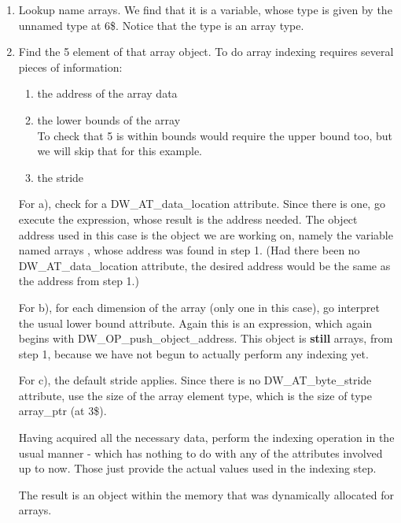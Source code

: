 \begin{enumerate}[1.]

\item Lookup name arrays. We find that it is a variable,
whose type is given by the unnamed type at 6\$. Notice that
the type is an array type.


\item Find the 5 element of that array object. To do array
indexing requires several pieces of information:

\begin{enumerate}[a]

\item  the address of the array data

\item the lower bounds of the array \\
\lbrack To check that 5 is within bounds would require the upper
bound too, but we will skip that for this example. \rbrack

\item the stride 

\end{enumerate}

For a), check for a DW\_AT\_data\_location attribute. Since
there is one, go execute the expression, whose result is
the address needed. The object address used in this case
is the object we are working on, namely the variable named
arrays , whose address was found in step 1. (Had there been
no DW\_AT\_data\_location attribute, the desired address would
be the same as the address from step 1.)

For b), for each dimension of the array (only one
in this case), go interpret the usual lower bound
attribute. Again this is an expression, which again begins
with DW\_OP\_push\_object\_address. This object is 
\textbf{still} arrays,
from step 1, because we have not begun to actually perform
any indexing yet.

For c), the default stride applies. Since there is no
DW\_AT\_byte\_stride attribute, use the size of the array element
type, which is the size of type array\_ptr (at 3\$).

Having acquired all the necessary data, perform the indexing
operation in the usual manner -  which has nothing to do with
any of the attributes involved up to now. Those just provide
the actual values used in the indexing step.

The result is an object within the memory that was dynamically
allocated for arrays.


\end{enumerate}
